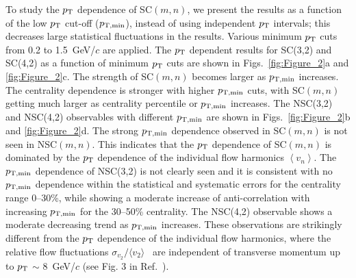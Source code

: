 To study the $p_{\rm T}$ dependence of SC$(m,n)$, we present the results as a function of the low $p_{\rm T}$ cut-off ($p_{\rm T, min}$), instead of using independent $p_{\rm T}$ intervals; this decreases large statistical fluctuations in the results. Various minimum $p_{\rm T}$ cuts from 0.2 to 1.5~GeV/$c$ are applied.
The $p_{\rm T}$ dependent results for SC(3,2) and SC(4,2) as a function of minimum $p_{\rm T}$ cuts are shown in Figs.~\ref{fig:Figure_2}a and \ref{fig:Figure_2}c.
The strength of SC$(m,n)$ becomes larger as $p_{\rm T, min}$ increases. 
The centrality dependence is stronger with higher $p_{\rm T, min}$ cuts, with SC$(m,n)$ getting much larger as centrality percentile or $p_{\rm T, min}$ increases. 
The NSC(3,2) and NSC(4,2) observables with different $p_{\rm T, min}$ are shown in Figs.~\ref{fig:Figure_2}b and \ref{fig:Figure_2}d.
The strong $p_{\rm T, min}$ dependence observed in SC$(m,n)$ is not seen in NSC$(m,n)$. 
This indicates that the $p_{\rm T}$ dependence of SC$(m,n)$ is dominated by the $p_{\rm T}$  dependence of the individual flow harmonics $\left<v_n\right>$. 
The $p_{\rm T, min}$ dependence of NSC(3,2) is not clearly seen and it is consistent with no $p_{\rm T, min}$ dependence within the statistical and systematic errors for the centrality range 0--30\%, while showing a moderate increase of anti-correlation with increasing $p_{\rm T, min}$ for the 30--50\% centrality.
The NSC(4,2) observable shows a moderate decreasing trend as $p_{\rm T, min}$ increases. These observations are strikingly different from the $p_{\rm T}$ dependence of the individual flow harmonics, where the relative flow fluctuations $\sigma_{v_2}/\langle v_{2} \rangle$~\cite{Voloshin:2008dg} are independent of transverse momentum up to $p_{\rm T}$ $\sim$ 8~GeV/$c$ (see Fig. 3 in Ref.~\cite{Abelev:2012di}).

